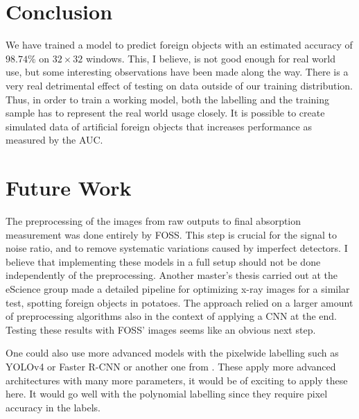 \section{Conclusion}
We have trained a model to predict foreign objects with an estimated accuracy of $98.74 \%$ on $32 \times 32$ windows.
This, I believe, is not good enough for real world use, but some interesting observations have been made along the way.
There is a very real detrimental effect of testing on data outside of our training distribution. 
Thus, in order to train a working model, both the labelling and the training sample has to represent the real world usage closely.
It is possible to create simulated data of artificial foreign objects that increases performance as measured by the \ac{AUC}.

\section{Future Work}
The preprocessing of the images from raw outputs to final absorption measurement was done entirely by FOSS.
This step is crucial for the signal to noise ratio, and to remove systematic variations caused by imperfect detectors.
I believe that implementing these models in a full setup should not be done independently of the preprocessing.
Another master's thesis carried out at the eScience group \cite{topicAdaptiveXrayInspection} made a detailed pipeline for optimizing x-ray images for a similar test, spotting foreign objects in potatoes. 
The approach relied on a larger amount of preprocessing algorithms also in the context of applying a \ac{CNN} at the end.
Testing these results with FOSS' images seems like an obvious next step.


One could also use more advanced models with the pixelwide labelling such as YOLOv4 \cite{bochkovskiyYOLOv4OptimalSpeed2020} or Faster R-CNN \cite{renFasterRCNNRealTime2017} or another one from \cite{PapersCodeCOCO}.
These apply more advanced architectures with many more parameters, it would be of exciting to apply these here.
It would go well with the polynomial labelling since they require pixel accuracy in the labels.
